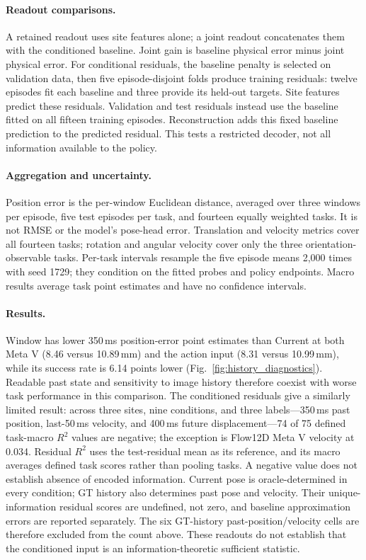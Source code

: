 \paragraph{Readout comparisons.}
A retained readout uses site features alone; a joint readout concatenates
them with the conditioned baseline. Joint gain is baseline physical error
minus joint physical error. For conditional residuals, the baseline
penalty is selected on validation data, then five episode-disjoint folds
produce training residuals: twelve episodes fit each baseline and three
provide its held-out targets. Site features predict these residuals.
Validation and test residuals instead use the baseline fitted on all
fifteen training episodes. Reconstruction adds this fixed baseline
prediction to the predicted residual. This tests a restricted decoder,
not all information available to the policy.

\paragraph{Aggregation and uncertainty.}
Position error is the per-window Euclidean distance, averaged over three
windows per episode, five test episodes per task, and fourteen equally
weighted tasks. It is not RMSE or the model's pose-head error. Translation
and velocity metrics cover all fourteen tasks; rotation and angular
velocity cover only the three orientation-observable tasks. Per-task
intervals resample the five episode means 2,000 times with seed 1729;
they condition on the fitted probes and policy endpoints. Macro results
average task point estimates and have no confidence intervals.

\paragraph{Results.}
Window has lower 350\,ms position-error point estimates than Current at
both Meta V (8.46 versus 10.89\,mm) and the action input (8.31 versus
10.99\,mm), while its success rate is 6.14 points lower
(Fig.~\ref{fig:history_diagnostics}). Readable past state and sensitivity
to image history therefore coexist with worse task performance in this
comparison. The conditioned residuals give a similarly limited result:
across three sites, nine conditions, and three labels---350\,ms past
position, last-50\,ms velocity, and 400\,ms future displacement---74 of
75 defined task-macro $R^2$ values are negative;
the exception is Flow12D Meta V velocity at 0.034.
Residual $R^2$ uses the test-residual mean as its reference, and its macro
averages defined task scores rather than pooling tasks. A negative value
does not establish absence of encoded information. Current pose is
oracle-determined in every condition; GT history also determines past
pose and velocity. Their unique-information residual scores are
undefined, not zero, and baseline approximation errors are reported
separately. The six GT-history past-position/velocity cells are therefore
excluded from the count above. These readouts do not establish that the
conditioned input is an information-theoretic sufficient statistic.

